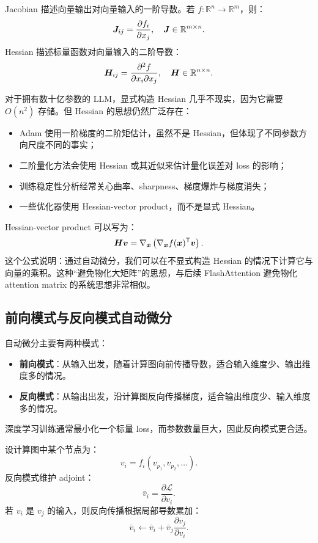 Jacobian 描述向量输出对向量输入的一阶导数。若 $f:\mathbb{R}^{n}\rightarrow\mathbb{R}^{m}$，则：
\[
  \bm{J}_{ij}
  =
  \frac{\partial f_i}{\partial x_j},
  \quad
  \bm{J}\in\mathbb{R}^{m\times n}.
\]
Hessian 描述标量函数对向量输入的二阶导数：
\[
  \bm{H}_{ij}
  =
  \frac{\partial^2 f}{\partial x_i\partial x_j},
  \quad
  \bm{H}\in\mathbb{R}^{n\times n}.
\]

对于拥有数十亿参数的 LLM，显式构造 Hessian 几乎不现实，因为它需要 $O(n^2)$ 存储。但 Hessian 的思想仍然广泛存在：

\begin{itemize}
  \item Adam 使用一阶梯度的二阶矩估计，虽然不是 Hessian，但体现了不同参数方向尺度不同的事实；
  \item 二阶量化方法会使用 Hessian 或其近似来估计量化误差对 loss 的影响；
  \item 训练稳定性分析经常关心曲率、sharpness、梯度爆炸与梯度消失；
  \item 一些优化器使用 Hessian-vector product，而不是显式 Hessian。
\end{itemize}

Hessian-vector product 可以写为：
\[
  \bm{H}\bm{v}
  =
  \nabla_{\bm{x}}
  \left(
    \nabla_{\bm{x}}f(\bm{x})^{\mathsf{T}}\bm{v}
  \right).
\]
这个公式说明：通过自动微分，我们可以在不显式构造 Hessian 的情况下计算它与向量的乘积。这种“避免物化大矩阵”的思想，与后续 FlashAttention 避免物化 attention matrix 的系统思想非常相似。

\subsection{前向模式与反向模式自动微分}
\label{subsec:forward-reverse-autodiff}

自动微分主要有两种模式：

\begin{itemize}
  \item \textbf{前向模式}：从输入出发，随着计算图向前传播导数，适合输入维度少、输出维度多的情况。
  \item \textbf{反向模式}：从输出出发，沿计算图反向传播梯度，适合输出维度少、输入维度多的情况。
\end{itemize}

深度学习训练通常最小化一个标量 loss，而参数数量巨大，因此反向模式更合适。

设计算图中某个节点为：
\[
  v_i=f_i(v_{p_1},v_{p_2},\ldots).
\]
反向模式维护 adjoint：
\[
  \bar{v}_i=\frac{\partial \mathcal{L}}{\partial v_i}.
\]
若 $v_i$ 是 $v_j$ 的输入，则反向传播根据局部导数累加：
\[
  \bar{v}_i
  \leftarrow
  \bar{v}_i+
  \bar{v}_j
  \frac{\partial v_j}{\partial v_i}.
\]

